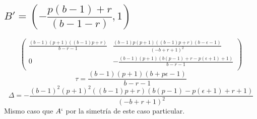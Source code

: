 \documentclass[11pt]{article}
\begin{document}
\subsection*{$B'=\left(-\dfrac{p(b-1)+ r}{(b-1-r)},1\right)$}
\begin{equation}
\left(
\begin{array}{cc}
 \frac{(b-1) (p+1) ((b-1) p+r)}{b-r-1} & \frac{(b-1) p (p+1) ((b-1) p+r) (b-\epsilon -1)}{(-b+r+1)^2} \\
 0 & -\frac{(b-1) (p+1) (b (p-1)+r-p (\epsilon +1)+1)}{b-r-1} \\
\end{array}
\right)
\end{equation}
\begin{equation}
\tau=\frac{(b-1) (p+1) (b+p \epsilon -1)}{b-r-1}
\end{equation}
\begin{equation}
\Delta=-\frac{(b-1)^2 (p+1)^2 ((b-1) p+r) (b (p-1)-p (\epsilon +1)+r+1)}{(-b+r+1)^2}
\end{equation}
Mismo caso que $A`$ por la simetría de este caso particular.
\end{document}
